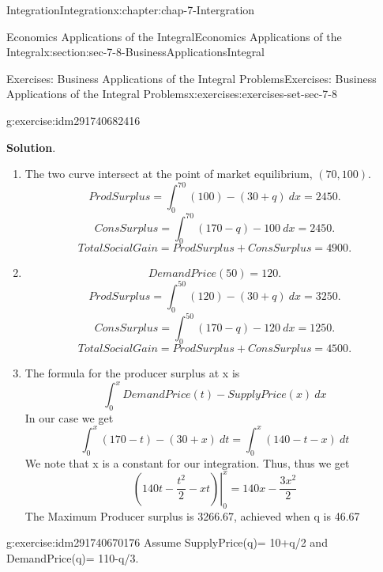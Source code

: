\documentclass[oneside,10pt,]{book}
\numberwithin{equation}{section}
\begin{document}
\begin{chapterptx}{Integration}{}{Integration}{}{}{x:chapter:chap-7-Intergration}
\begin{sectionptx}{Economics Applications of the Integral}{}{Economics Applications of the Integral}{}{}{x:section:sec-7-8-BusinessApplicationsIntegral}
\begin{exercises-subsection}{Exercises: Business Applications of the Integral Problems}{}{Exercises: Business Applications of the Integral Problems}{}{}{x:exercises:exercises-set-sec-7-8}
\begin{divisionexercise}{7}{}{}{g:exercise:idm291740682416}
\begin{enumerate}[label=(\alph*)]
\end{enumerate}
\par\smallskip%
\noindent\textbf{Solution}.\hypertarget{g:solution:idm291740679040}{}\quad{}%
\begin{enumerate}[label=(\alph*)]
\item{}The two curve intersect at the point of market equilibrium, \((70, 100)\).%
%
\begin{equation*}
ProdSurplus=
\int_0^{70}
(100)-
(30+q)\ dx=2450.
\end{equation*}
%
\begin{equation*}
ConsSurplus=
\int_0^{70}
(170-q)-100\ dx=2450.
\end{equation*}
%
\begin{equation*}
TotalSocialGain=ProdSurplus+ConsSurplus=4900.
\end{equation*}
\item{}%
\begin{equation*}
DemandPrice(50)=120.
\end{equation*}
%
\begin{equation*}
ProdSurplus=
\int_0^{50}
(120)-
(30+q)\ dx=3250.
\end{equation*}
%
\begin{equation*}
ConsSurplus=
\int_0^{50}
(170-q)-120\ dx=1250.
\end{equation*}
%
\begin{equation*}
TotalSocialGain=ProdSurplus+ConsSurplus=4500.
\end{equation*}
%
\item{}The formula for the producer surplus at x is%
%
\begin{equation*}
\int_0^x DemandPrice(t)-SupplyPrice(x)\ dx
\end{equation*}
In our case we get%
%
\begin{equation*}
\int_0^x (170-t)-(30+x) \ dt=\int_0^x(140-t-x) \ dt
\end{equation*}
We note that x is a constant for our integration.  Thus, thus we get%
%
\begin{equation*}
\left.\left({140t-\frac{t^2}{2}-xt}\right)\right|_0^x=140x-\frac{3x^2}{2}
\end{equation*}
The Maximum Producer surplus is 3266.67, achieved when q is 46.67%
\end{enumerate}
\end{divisionexercise}%
\begin{divisionexercise}{8}{}{}{g:exercise:idm291740670176}%
Assume SupplyPrice(q)= 10+q\slash{}2 and DemandPrice(q)= 110-q\slash{}3.%

\end{divisionexercise}
\end{exercises-subsection}
\end{sectionptx}
\end{chapterptx}
\end{document}

